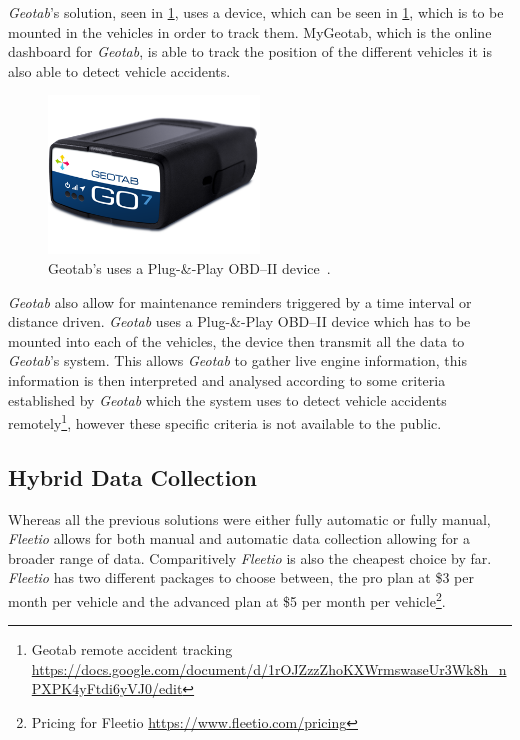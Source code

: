 \textit{Geotab}'s solution, seen in \cref{fig:Geotab_device}, uses a device, which can be seen in \cref{fig:Geotab_device}, which is to be mounted in the vehicles in order to track them. MyGeotab, which is the online dashboard for \textit{Geotab}, is able to track the position of the different vehicles it is also able to detect vehicle accidents\cite{geotab}.
\begin{figure}[h!]
    \centering
    \includegraphics[width=0.5\textwidth]{img/geotab-device-side-view.png}
	\caption{Geotab's uses a Plug-\&-Play OBD--II device~\cite{geotab_str}.}
    \label{fig:Geotab_device}
\end{figure}

\textit{Geotab} also allow for maintenance reminders triggered by a time interval or distance driven.
\textit{Geotab} uses a Plug-\&-Play OBD--II device which has to be mounted into each of the vehicles, the device then transmit all the data to \textit{Geotab}'s system.
This allows \textit{Geotab} to gather live engine information, this information is then interpreted and analysed according to some criteria established by \textit{Geotab} which the system uses to detect vehicle accidents remotely\footnote{Geotab remote accident tracking \url{https://docs.google.com/document/d/1rOJZzzZhoKXWrmswaseUr3Wk8h_nPXPK4yFtdi6yVJ0/edit}}, however these specific criteria is not available to the public.
\subsection{Hybrid Data Collection}
Whereas all the previous solutions were either fully automatic or fully manual, \textit{Fleetio} allows for both manual and automatic data collection allowing for a broader range of data.
Comparitively \textit{Fleetio} is also the cheapest choice by far.
\textit{Fleetio} has two different packages to choose between, the pro plan at \$3 per month per vehicle and the advanced plan at \$5 per month per vehicle\footnote{Pricing for Fleetio \url{https://www.fleetio.com/pricing}}.
